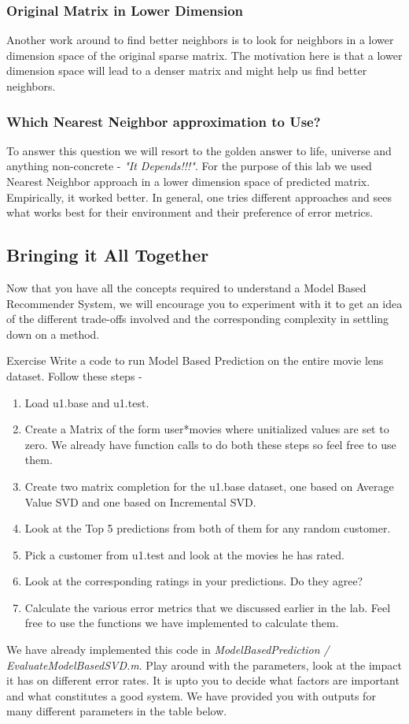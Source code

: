   \subsubsection{Original Matrix in Lower Dimension}
  Another work around to find better neighbors is to look for neighbors in a lower dimension space of the original sparse matrix. The motivation here is that a lower dimension space will lead to a denser matrix and might help us find better neighbors.
  \subsubsection{Which Nearest Neighbor approximation to Use?}
  To answer this question we will resort to the golden answer to life, universe and anything non-concrete - \textit{"It Depends!!!"}. For the purpose of this lab we used Nearest Neighbor approach in a lower dimension space of predicted matrix. Empirically, it worked better. In general, one tries different approaches and sees what works best for their environment and their preference of error metrics.
  \subsection{Bringing it All Together}
  Now that you have all the concepts required to understand a Model Based Recommender System, we will encourage you to experiment with it to get an idea of the different trade-offs involved and the corresponding complexity in settling down on a method.
\begin{myremark}{Exercise }
Write a code to run Model Based Prediction on the entire movie lens dataset. Follow these steps - 
\begin{enumerate}
\item Load u1.base and u1.test. 
\item Create a Matrix of the form user*movies where unitialized values are set to zero. We already have function calls to do both these steps so feel free to use them.
\item Create two matrix completion for the u1.base dataset, one based on Average Value SVD and one based on Incremental SVD.
\item Look at the Top 5 predictions from both of them for any random customer.
\item Pick a customer from u1.test and look at the movies he has rated. 
\item Look at the corresponding ratings in your predictions. Do they agree?
\item Calculate the various error metrics that we discussed earlier in the lab. Feel free to use the functions we have implemented to calculate them.
\end{enumerate}
We have already implemented this code in \textit{ModelBasedPrediction / EvaluateModelBasedSVD.m}. Play around with the parameters, look at the impact it has on different error rates. It is upto you to decide what factors are important and what constitutes a good system. We have provided you with outputs for many different parameters in the table below.
\end{myremark}

